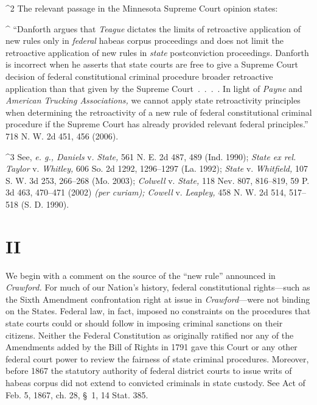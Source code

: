 ^2 The relevant passage in the Minnesota Supreme Court opinion states:

  ^ ``Danforth argues that \emph{Teague} dictates the limits of retroactive
application of new rules only in \emph{federal} habeas corpus proceedings
and does not limit the retroactive application of new rules in \emph{state}
postconviction proceedings. Danforth is incorrect when he asserts that
state courts are free to give a Supreme Court decision of federal
constitutional criminal procedure broader retroactive application than
that given by the Supreme Court~.~.~.~. In light of \emph{Payne} and
\emph{American Trucking Associations,} we cannot apply state retroactivity
principles when determining the retroactivity of a new rule of federal
constitutional criminal procedure if the Supreme Court has already
provided relevant federal principles.'' 718 N. W. 2d 451, 456
(2006).

^3 See, \emph{e. g., Daniels} v. \emph{State,} 561 N. E. 2d 487, 489 (Ind.
1990); \emph{State ex rel. Taylor} v. \emph{Whitley,} 606 So. 2d 1292,
1296--1297 (La. 1992); \emph{State} v. \emph{Whitfield,} 107 S. W. 3d 253,
266--268 (Mo. 2003); \emph{Colwell} v. \emph{State,} 118 Nev. 807, 816--819,
59 P. 3d 463, 470--471 (2002) \emph{(per curiam); Cowell} v. \emph{Leapley,}
458 N. W. 2d 514, 517--518 (S. D. 1990).

\section{II}

  We begin with a comment on the source of the ``new rule''
announced in \emph{Crawford.} For much of our Nation's history, federal
constitutional rights---such as the Sixth Amendment confrontation right
at issue in \emph{Crawford}---were not binding on the States. Federal law,
in fact, imposed no constraints on the procedures that state courts
could or should follow in imposing criminal sanctions on their citizens.
Neither the Federal Constitution as originally ratified nor any of the
Amendments added by the Bill of Rights in 1791 gave this Court or any
other federal court power to review the fairness of state criminal
procedures. Moreover, before 1867 the statutory authority of federal
district courts to issue writs of habeas corpus did not extend to
convicted criminals in state custody. See Act of Feb. 5, 1867, ch. 28,
\S~1, 14 Stat. 385.

